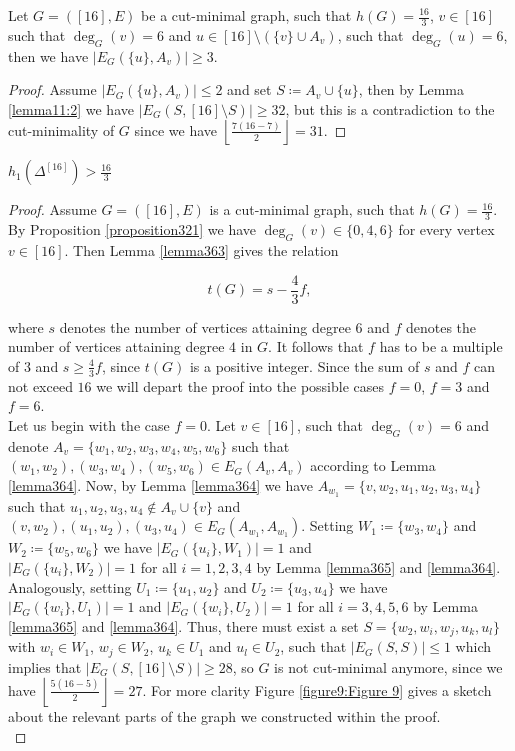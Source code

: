 \begin{lem}\label{lemma368}
Let \(G=([16],E)\) be a cut-minimal graph, such that \(h(G)=\frac{16}{3}\), \(v\in [16]\) such that \(\deg_G(v)=6\) and \(u\in [16]\setminus (\{v\}\cup A_v)\), such that \(\deg_G(u)=6\), then we have \(|E_G(\{u\},A_v)|\geq 3\).
\begin{proof}
Assume \(|E_G(\{u\},A_v)|\leq 2\) and set \(S\coloneqq A_v\cup\{u\}\), then by Lemma \ref{lemma11:2} we have \(|E_G(S,[16]\setminus S)|\geq 32\), but this is a contradiction to the cut-minimality of \(G\) since we have \(\left\lfloor\frac{7(16-7)}{2}\right\rfloor=31\).
\end{proof}
\end{lem}

\begin{thm}\label{theoremn=16}
\(h_1(\Delta^{[16]})>\frac{16}{3}\)
\begin{proof}
Assume \(G=([16],E)\) is a cut-minimal graph, such that \(h(G)=\frac{16}{3}\). By Proposition \ref{proposition321} we have \(\deg_G(v)\in\{0,4,6\}\) for every vertex \(v\in [16]\). Then Lemma \ref{lemma363} gives the relation

\begin{equation}\label{equation361}
t(G)=s-\frac{4}{3}f,
\end{equation}

where \(s\) denotes the number of vertices attaining degree \(6\) and \(f\) denotes the number of vertices attaining degree \(4\) in \(G\). It follows that \(f\) has to be a multiple of \(3\) and \(s\geq\frac{4}{3}f\), since \(t(G)\) is a positive integer. Since the sum of \(s\) and \(f\) can not exceed \(16\) we will depart the proof into the possible cases \(f=0\), \(f=3\) and \(f=6\).\\
Let us begin with the case \(f=0\). Let \(v\in [16]\), such that \(\deg_G(v)=6\) and denote \(A_v=\{w_1,w_2,w_3,w_4,w_5,w_6\}\) such that \((w_1,w_2),(w_3,w_4),(w_5,w_6)\in E_G(A_v,A_v)\) according to Lemma \ref{lemma364}. Now, by Lemma \ref{lemma364} we have \(A_{w_1}=\{v,w_2,u_1,u_2,u_3,u_4\}\) such that \(u_1,u_2,u_3,u_4\notin A_v\cup \{v\}\) and \((v,w_2),(u_1,u_2),(u_3,u_4)\in E_G(A_{w_1},A_{w_1})\). Setting \(W_1\coloneqq\{w_3,w_4\}\) and \(W_2\coloneqq\{w_5,w_6\}\) we have \(|E_G(\{u_i\},W_1)|=1\) and\\
\(|E_G(\{u_i\},W_2)|=1\) for all \(i=1,2,3,4\) by Lemma \ref{lemma365} and \ref{lemma364}. Analogously, setting \(U_1\coloneqq\{u_1,u_2\}\) and \(U_2\coloneqq\{u_3,u_4\}\) we have \(|E_G(\{w_i\},U_1)|=1\) and \(|E_G(\{w_i\},U_2)|=1\) for all \(i=3,4,5,6\) by Lemma \ref{lemma365} and \ref{lemma364}. Thus, there must exist a set \(S=\{w_2,w_i,w_j,u_k,u_l\}\) with \(w_i\in W_1\), \(w_j\in W_2\), \(u_k\in U_1\) and \(u_l\in U_2\), such that \(|E_G(S,S)|\leq 1\) which implies that \(|E_G(S,[16]\setminus S)|\geq 28\), so \(G\) is not cut-minimal anymore, since we have \(\left\lfloor\frac{5(16-5)}{2}\right\rfloor=27\). For more clarity Figure \ref{figure9:Figure 9} gives a sketch about the relevant parts of the graph we constructed within the proof.\\


\end{proof}
\end{thm}
